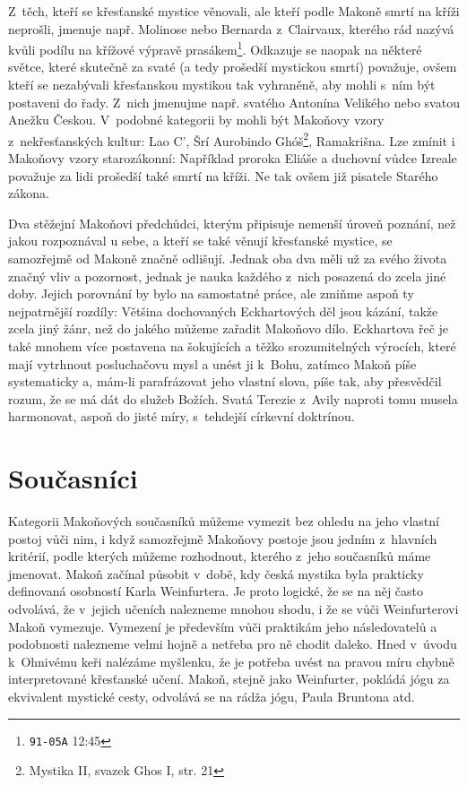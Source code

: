 Z~těch, kteří se křesťanské mystice věnovali, ale kteří podle Makoně smrtí na
kříži neprošli, jmenuje např. Molinose nebo Bernarda z~Clairvaux, kterého rád
nazývá kvůli podílu na křížové výpravě prasákem\footnote{\texttt{91-05A}
12:45}. Odkazuje se naopak na některé
světce, které skutečně za svaté (a tedy prošedší mystickou smrtí) považuje, ovšem
kteří se nezabývali křesťanskou mystikou tak vyhraněně, aby mohli s~ním být
postaveni do řady. Z~nich jmenujme např. svatého Antonína
Velikého nebo svatou
Anežku Českou. V~podobné kategorii by mohli být Makoňovy vzory z~nekřesťanských
kultur: Lao C', Šrí Aurobindo Ghóš\footnote{Mystika II,
svazek Ghos I, str. 21}, Ramakrišna. Lze zmínit i Makoňovy vzory
starozákonní: Například proroka Eliáše a duchovní vůdce
Izreale považuje za lidi prošedší také smrtí na kříži. Ne tak ovšem již pisatele
Starého zákona.

Dva stěžejní Makoňovi předchůdci, kterým připisuje nemenší úroveň poznání, než jakou
rozpoznával u sebe, a kteří se také věnují křesťanské mystice, se samozřejmě od
Makoně značně odlišují. Jednak oba dva měli už za svého života značný vliv a
pozornost\cite{hackett2012companion}\cite{britannicaTeresa}, jednak je nauka každého z~nich posazená do zcela jiné doby. Jejich
porovnání by bylo na samostatné práce, ale zmiňme aspoň ty nejpatrnější rozdíly:
Většina dochovaných Eckhartových děl jsou kázání, takže zcela jiný žánr, než do
jakého můžeme zařadit Makoňovo dílo. Eckhartova řeč je také mnohem více
postavena na šokujících a těžko srozumitelných výrocích, které mají vytrhnout
posluchačovu mysl a unést ji k~Bohu\cite{landauer1978eckhart}, zatímco Makoň píše systematicky a, mám-li
parafrázovat jeho vlastní slova, píše tak, aby přesvědčil rozum, že se má dát do služeb
Božích. Svatá Terezie z~Avily naproti tomu musela harmonovat, aspoň do jisté
míry, s~tehdejší církevní doktrínou\cite{eire2019life}.

\section{Současníci}

Kategorii Makoňových současníků můžeme vymezit bez ohledu na jeho vlastní postoj
vůči nim, i když samozřejmě Makoňovy postoje jsou jedním z~hlavních kritérií,
podle kterých můžeme rozhodnout, kterého z~jeho současníků máme jmenovat. Makoň
začínal působit v~době, kdy česká mystika byla prakticky definovaná osobností
Karla Weinfurtera\cite{sanitrak2006dejiny1}. Je proto logické, že se na něj
často odvolává, že v~jejich učeních nalezneme mnohou shodu, i že se vůči
Weinfurterovi Makoň vymezuje. Vymezení je především vůči praktikám jeho
následovatelů a podobnosti nalezneme velmi hojně a netřeba pro ně chodit
daleko. Hned v~úvodu k~Ohnivému keři\cite{weinfurter1923ohnivy} nalézáme
myšlenku, že je potřeba uvést na pravou míru chybně interpretované křesťanské
učení. Makoň, stejně jako Weinfurter, pokládá jógu za ekvivalent mystické cesty,
odvolává se na rádža jógu, Paula Bruntona atd.


